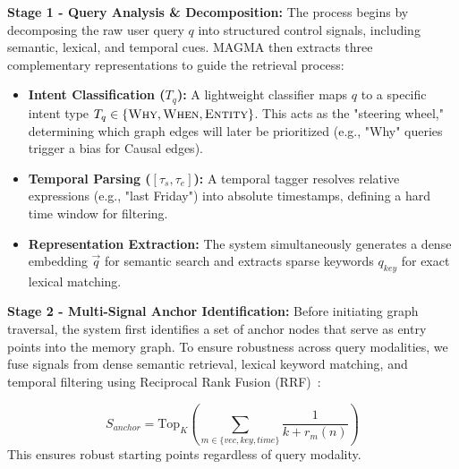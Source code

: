 \documentclass[11pt]{article}
\begin{document}

\noindent\textbf{Stage 1 - Query Analysis \& Decomposition:}
The process begins by decomposing the raw user query $q$ into structured control signals, including semantic, lexical, and temporal cues. MAGMA then extracts three complementary representations to guide the retrieval process:
\begin{itemize}[leftmargin=*, itemsep=0pt, topsep=2pt]
    \item \textbf{Intent Classification ($T_q$):} A lightweight classifier maps $q$ to a specific intent type $T_q \in \{ \textsc{Why}, \textsc{When}, \textsc{Entity} \}$. This acts as the "steering wheel," determining which graph edges will later be prioritized (e.g., "Why" queries trigger a bias for Causal edges).
    \item \textbf{Temporal Parsing ($[\tau_s, \tau_e]$):} A temporal tagger resolves relative expressions (e.g., "last Friday") into absolute timestamps, defining a hard time window for filtering.
    \item \textbf{Representation Extraction:} The system simultaneously generates a dense embedding $\vec{q}$ for semantic search and extracts sparse keywords $q_{key}$ for exact lexical matching.
\end{itemize}


\noindent\textbf{Stage 2 - Multi-Signal Anchor Identification:}
Before initiating graph traversal, the system first identifies a set of anchor nodes that serve as entry points into the memory graph. To ensure robustness across query modalities, we fuse signals from dense semantic retrieval, lexical keyword matching, and temporal filtering using Reciprocal Rank Fusion (RRF)~\cite{Cormack2009}:

\begin{equation}
    \label{eq:rrf}
    S_{anchor} = \text{Top}_K \left( \sum_{m \in \{vec, key, time\}} \frac{1}{k + r_m(n)} \right)
\end{equation}
This ensures robust starting points regardless of query modality.
\end{document}
